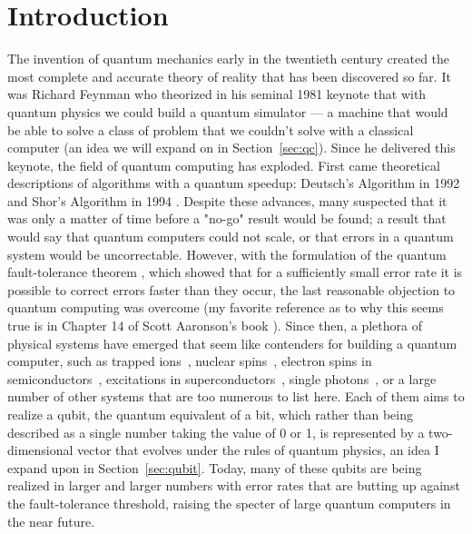 \chapter{Introduction}

The invention of quantum mechanics early in the twentieth century created the most complete and accurate
theory of reality that has been discovered so far. It was Richard Feynman who theorized in his
seminal 1981 keynote \cite{Feynman1982} that with quantum physics we could build a quantum simulator ---
a machine that would be able to solve a class of problem that we couldn't solve with a
classical computer (an idea we will expand on in Section~\ref{sec:qc}). Since he delivered this keynote, the
field of quantum computing has exploded. First came theoretical descriptions of algorithms
with a quantum speedup: Deutsch's Algorithm in 1992 \cite{Deutsch} and Shor's Algorithm in 1994 \cite{Shor}.
Despite these advances, many suspected that it was only a matter of time before a "no-go" result would
be found; a result that would say that quantum computers could not scale, or that errors in a quantum system would be uncorrectable.
However, with the formulation of the quantum fault-tolerance theorem \cite{1996quant.ph.11025A,doi:10.1098/rspa.1998.0167}, which
showed that for a sufficiently small error rate it is possible to correct errors faster than they occur, the last
reasonable objection to quantum computing was overcome (my favorite reference as to why this seems true
is in Chapter 14 of Scott Aaronson's book \cite{Aaronson:skepticism}). Since then, a plethora of physical
systems have emerged that seem like contenders for building a quantum computer, such as trapped
ions~\cite{doi:10.1063/1.5088164}, nuclear spins~\cite{acs.nanolett.8b00006}, electron spins in
semiconductors~\cite{RevModPhys.79.1217}, excitations in superconductors~\cite{Wendin_2017},
single photons~\cite{OBrien1567}, or a large number of other systems that are too numerous to list here.
Each of them aims to realize a qubit, the quantum equivalent of a bit, which rather than being described
as a single number taking the value of 0 or 1, is represented by a two-dimensional vector that evolves under the rules
of quantum physics, an idea I expand upon in Section~\ref{sec:qubit}. Today, many of these qubits are being
realized in larger and larger numbers with error rates that are butting up against the fault-tolerance threshold,
raising the specter of large quantum computers in the near future.

